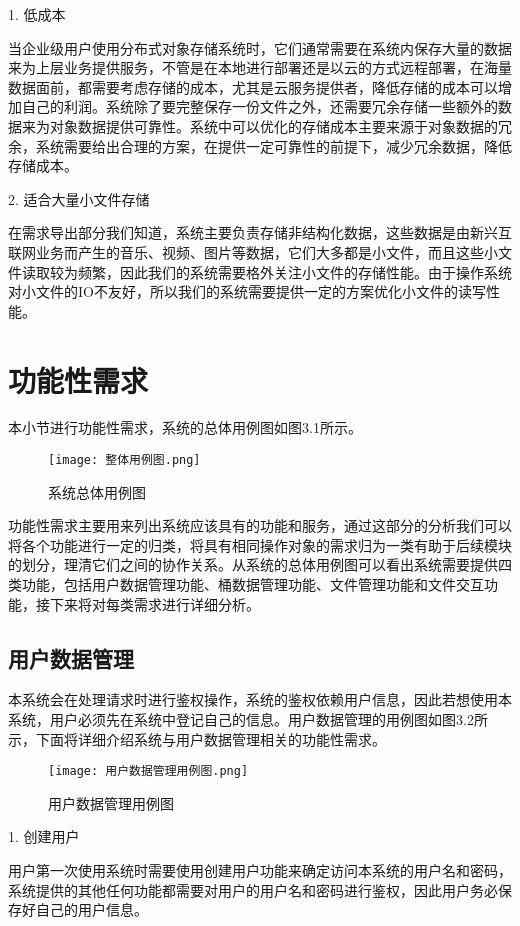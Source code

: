 1. 低成本

当企业级用户使用分布式对象存储系统时，它们通常需要在系统内保存大量的数据来为上层业务提供服务，不管是在本地进行部署还是以云的方式远程部署，在海量数据面前，都需要考虑存储的成本，尤其是云服务提供者，降低存储的成本可以增加自己的利润。系统除了要完整保存一份文件之外，还需要冗余存储一些额外的数据来为对象数据提供可靠性。系统中可以优化的存储成本主要来源于对象数据的冗余，系统需要给出合理的方案，在提供一定可靠性的前提下，减少冗余数据，降低存储成本。

2. 适合大量小文件存储

在需求导出部分我们知道，系统主要负责存储非结构化数据，这些数据是由新兴互联网业务而产生的音乐、视频、图片等数据，它们大多都是小文件，而且这些小文件读取较为频繁，因此我们的系统需要格外关注小文件的存储性能。由于操作系统对小文件的IO不友好，所以我们的系统需要提供一定的方案优化小文件的读写性能。

\section{功能性需求}%
本小节进行功能性需求，系统的总体用例图如图3.1所示。

\begin{figure}[h]
    \centering
    \texttt{[image: 整体用例图.png]}
    \caption{系统总体用例图}
\end{figure}

功能性需求主要用来列出系统应该具有的功能和服务，通过这部分的分析我们可以将各个功能进行一定的归类，将具有相同操作对象的需求归为一类有助于后续模块的划分，理清它们之间的协作关系。从系统的总体用例图可以看出系统需要提供四类功能，包括用户数据管理功能、桶数据管理功能、文件管理功能和文件交互功能，接下来将对每类需求进行详细分析。

\subsection{用户数据管理}
本系统会在处理请求时进行鉴权操作，系统的鉴权依赖用户信息，因此若想使用本系统，用户必须先在系统中登记自己的信息。用户数据管理的用例图如图3.2所示，下面将详细介绍系统与用户数据管理相关的功能性需求。

\begin{figure}[h]
    \centering
    \texttt{[image: 用户数据管理用例图.png]}
    \caption{用户数据管理用例图}
\end{figure}

1. 创建用户

用户第一次使用系统时需要使用创建用户功能来确定访问本系统的用户名和密码，系统提供的其他任何功能都需要对用户的用户名和密码进行鉴权，因此用户务必保存好自己的用户信息。

